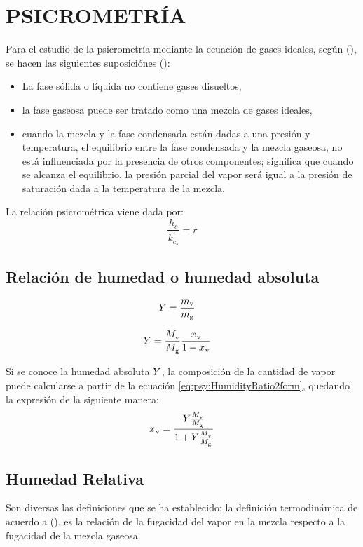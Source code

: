 \section{PSICROMETR\'IA}

Para el estudio de la psicrometr\'ia mediante la ecuaci\'on de gases ideales, seg\'un (), se hacen las siguientes suposici\'ones ():

\begin{itemize}
  \item La fase s\'olida o l\'iquida no contiene gases disueltos,
  \item la fase gaseosa puede ser tratado como una mezcla de gases ideales,
  \item cuando la mezcla y la fase condensada est\'an dadas a una presi\'on y temperatura, el equilibrio entre la fase condensada y la mezcla gaseosa, no est\'a influenciada por la presencia de otros componentes; significa que cuando se alcanza el equilibrio, la presi\'on parcial del vapor ser\'a igual a la presi\'on de saturaci\'on dada a la temperatura de la mezcla.
\end{itemize}

La relaci\'on psicrométrica viene dada por:
\begin{equation}
  \frac{h_{c}}{k_{c_s}^{'}} = r
\end{equation}

\eqVanDerWaals

\subsection{Relación de humedad o humedad absoluta}
\begin{align}
  Y &= \frac{{m}_{{\text{\ensuremath{\text{v}}}}}}{{m}_{{\text{\ensuremath{\text{g}}}}}}
\end{align}

\begin{align}
  \label{eq:psy:HumidityRatio2form}
  Y &= \frac{M_{{\text{\ensuremath{\text{v}}}}}^{}}{M_{{\text{\ensuremath{\text{g}}}}}^{}} \frac{{x_{}}_{{\text{\ensuremath{\text{v}}}}}}{1-{{x_{}}_{{\text{\ensuremath{\text{v}}}}}}}
\end{align}

Si se conoce la humedad absoluta $Y$, la composición de la cantidad de vapor puede calcularse a partir de la ecuación \eqref{eq:psy:HumidityRatio2form}, quedando la expresión de la siguiente manera:
\begin{equation}
  {x_{}}_{{\text{\ensuremath{\text{v}}}}} = \frac{Y \frac{M_{{\text{\ensuremath{\text{v}}}}}^{}}{M_{{\text{\ensuremath{\text{g}}}}}^{}}}{1 + Y \frac{M_{{\text{\ensuremath{\text{v}}}}}^{}}{M_{{\text{\ensuremath{\text{g}}}}}^{}}}
\end{equation}

\subsection{Humedad Relativa}
Son diversas las definiciones que se ha establecido; la definición termodinámica de acuerdo a (), es la relación de la fugacidad del vapor en la mezcla respecto a la fugacidad de la mezcla gaseosa.

